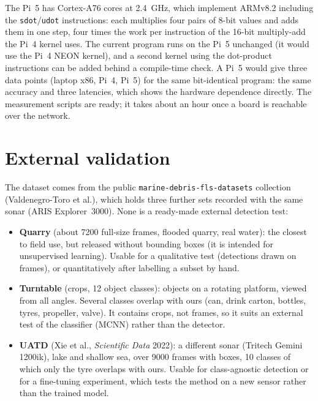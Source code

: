 \documentclass[11pt,a4paper]{article}
\begin{document}
The Pi~5 has Cortex-A76 cores at 2.4~GHz, which implement ARMv8.2 including
the \texttt{sdot}/\texttt{udot} instructions: each multiplies four pairs of
8-bit values and adds them in one step, four times the work per instruction
of the 16-bit multiply-add the Pi~4 kernel uses. The current program runs
on the Pi~5 unchanged (it would use the Pi~4 NEON kernel), and a second
kernel using the dot-product instructions can be added behind a compile-time
check. A Pi~5 would give three data points (laptop x86, Pi~4, Pi~5) for the
same bit-identical program: the same accuracy and three latencies, which
shows the hardware dependence directly. The measurement scripts are ready;
it takes about an hour once a board is reachable over the network.

\section{External validation}
\label{sec:external}

The dataset comes from the public \texttt{marine-debris-fls-datasets}
collection (Valdenegro-Toro et al.), which holds three further sets recorded
with the same sonar (ARIS Explorer~3000). None is a ready-made external
detection test:

\begin{itemize}
  \item \textbf{Quarry} (about \num{7200} full-size frames, flooded quarry, real
        water): the closest to field use, but released without bounding boxes
        (it is intended for unsupervised learning). Usable for a qualitative
        test (detections drawn on frames), or quantitatively after labelling
        a subset by hand.
  \item \textbf{Turntable} (crops, 12 object classes): objects on a rotating
        platform, viewed from all angles. Several classes overlap with ours
        (can, drink carton, bottles, tyres, propeller, valve). It contains
        crops, not frames, so it suits an external test of the classifier
        (MCNN) rather than the detector.
  \item \textbf{UATD} (Xie et al., \emph{Scientific Data} 2022): a different
        sonar (Tritech Gemini 1200ik), lake and shallow sea, over \num{9000}
        frames with boxes, 10 classes of which only the tyre overlaps with
        ours. Usable for class-agnostic detection or for a fine-tuning
        experiment, which tests the method on a new sensor rather than the
        trained model.
\end{itemize}
\end{document}
